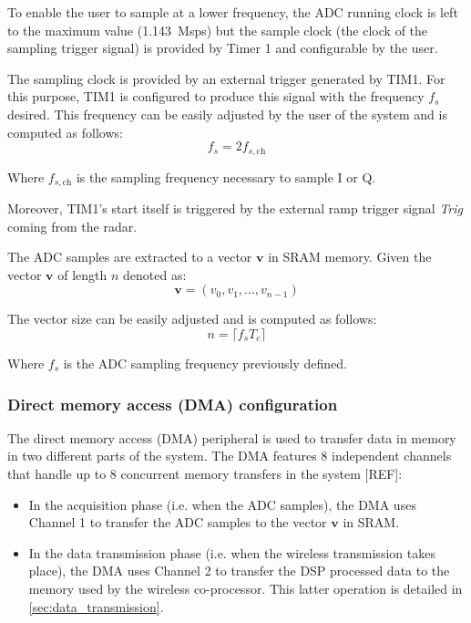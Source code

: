To enable the user to sample at a lower frequency, the ADC running clock is left to the maximum value (\SI{1.143}{Msps}) but the sample clock (the clock of the sampling trigger signal) is provided by Timer 1 and configurable by the user.

The sampling clock is provided by an external trigger generated by TIM1. For this purpose, TIM1 is configured to produce this signal with the frequency $f_{s}$ desired. This frequency can be easily adjusted by the user of the system and is computed as follows:
\begin{equation}
	f_s = 2 f_{s,\mathrm{ch}}
\end{equation}

Where $f_{s,\mathrm{ch}}$ is the sampling frequency necessary to sample I or Q.

Moreover, TIM1's start itself is triggered by the external ramp trigger signal \textit{Trig} coming from the radar.

The ADC samples are extracted to a vector $\mathbf{v}$ in SRAM memory. Given the vector $\mathbf{v}$ of length $n$ denoted as:
\begin{equation}
 \mathbf{v} = (v_0, v_1, ..., v_{n-1})
\end{equation}

The vector size can be easily adjusted and is computed as follows:
\begin{equation}
	n = \lceil f_s T_c \rceil
\end{equation}

Where $f_s$ is the ADC sampling frequency previously defined.

\subsubsection{Direct memory access (DMA) configuration} \label{sec:dma}

The direct memory access (DMA) peripheral is used to transfer data in memory in two different parts of the system. The DMA features 8 independent channels that handle up to 8 concurrent memory transfers in the system [REF]:
\begin{itemize}
	\item In the acquisition phase (i.e. when the ADC samples), the DMA uses Channel 1 to transfer the ADC samples to the vector $\mathbf{v}$ in SRAM.
	\item In the data transmission phase (i.e. when the wireless transmission takes place), the DMA uses Channel 2 to transfer the DSP processed data to the memory used by the wireless co-processor. This latter operation is detailed in \cref{sec:data_transmission}.
\end{itemize}


